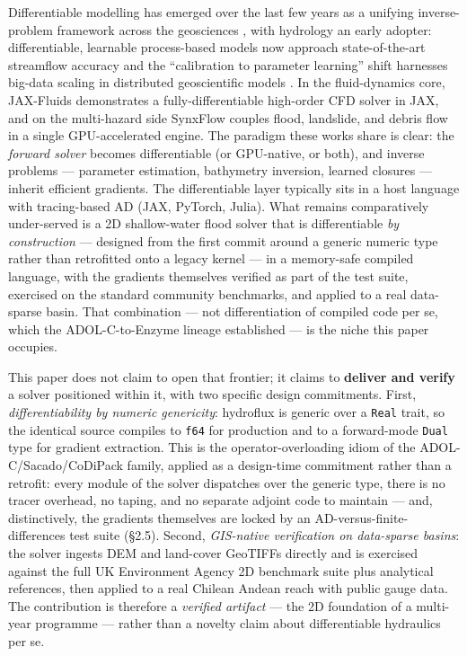 Differentiable modelling has emerged over the last few years as a
unifying inverse-problem framework across the geosciences
\citep{Shen2023}, with hydrology an early adopter: differentiable,
learnable process-based models now approach state-of-the-art streamflow
accuracy \citep{Feng2022} and the ``calibration to parameter learning''
shift harnesses big-data scaling in distributed geoscientific models
\citep{Tsai2021}. In the fluid-dynamics core, JAX-Fluids
\citep{Bezgin2023} demonstrates a fully-differentiable high-order CFD
solver in JAX, and on the multi-hazard side SynxFlow \citep{Xia2025}
couples flood, landslide, and debris flow in a single GPU-accelerated
engine. The paradigm these works share is clear: the \emph{forward
solver} becomes differentiable (or GPU-native, or both), and inverse
problems --- parameter estimation, bathymetry inversion, learned
closures --- inherit efficient gradients. The differentiable layer
typically sits in a host language with tracing-based AD (JAX, PyTorch,
Julia). What remains comparatively under-served is a 2D shallow-water
flood solver that is differentiable \emph{by construction} --- designed
from the first commit around a generic numeric type rather than
retrofitted onto a legacy kernel --- in a memory-safe compiled language,
with the gradients themselves verified as part of the test suite,
exercised on the standard community benchmarks, and applied to a real
data-sparse basin. That combination --- not differentiation of compiled
code per se, which the ADOL-C-to-Enzyme lineage established --- is the
niche this paper occupies.

This paper does not claim to open that frontier; it claims to
\textbf{deliver and verify} a solver positioned within it, with two
specific design commitments. First, \emph{differentiability by numeric
genericity}: hydroflux is generic over a \texttt{Real} trait, so the
identical source compiles to \texttt{f64} for production and to a
forward-mode \texttt{Dual} type for gradient extraction. This is the
operator-overloading idiom of the ADOL-C/Sacado/CoDiPack family, applied
as a design-time commitment rather than a retrofit: every module of the
solver dispatches over the generic type, there is no tracer overhead, no
taping, and no separate adjoint code to maintain --- and, distinctively,
the gradients themselves are locked by an AD-versus-finite-differences
test suite (§2.5). Second, \emph{GIS-native verification on data-sparse
basins}: the solver ingests DEM and land-cover GeoTIFFs directly and is
exercised against the full UK Environment Agency 2D benchmark suite
\citep{NeelzPender2013} plus analytical references, then applied to a
real Chilean Andean reach with public gauge data. The contribution is
therefore a \emph{verified artifact} --- the 2D foundation of a
multi-year programme --- rather than a novelty claim about
differentiable hydraulics per se.

